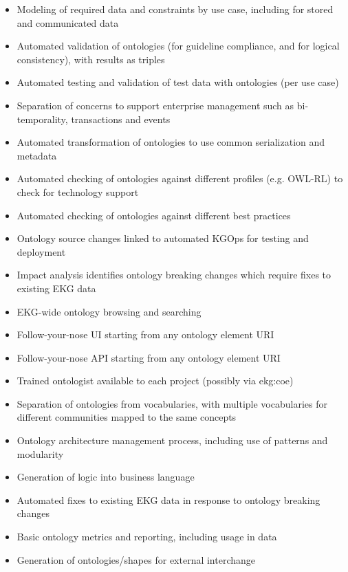 \begin{itemize}
    \item Modeling of required data and constraints by use case, including for stored and communicated data
    \item Automated validation of ontologies (for guideline compliance, and for logical consistency),
          with results as triples
    \item Automated testing and validation of test data with ontologies (per use case)
    \item Separation of concerns to support enterprise management such as bi-temporality, transactions and events
    \item Automated transformation of ontologies to use common serialization and metadata
    \item Automated checking of ontologies against different profiles (e.g. OWL-RL) to check for technology support
    \item Automated checking of ontologies against different best practices
    \item Ontology source changes linked to automated KGOps for testing and deployment
    \item Impact analysis identifies ontology breaking changes which require fixes to existing EKG data
    \item EKG-wide ontology browsing and searching
    \item Follow-your-nose UI starting from any ontology element URI
    \item Follow-your-nose API starting from any ontology element URI
    \item Trained ontologist available to each project (possibly via \gls{ekg:coe})
\end{itemize}

\ekgmmscoringlevelFour

\begin{itemize}
    \item Separation of ontologies from vocabularies, with multiple vocabularies for different communities
          mapped to the same concepts
    \item Ontology architecture management process, including use of patterns and modularity
    \item Generation of logic into business language
    \item Automated fixes to existing EKG data in response to ontology breaking changes
    \item Basic ontology metrics and reporting, including usage in data
    \item Generation of ontologies/shapes for external interchange
\end{itemize}

